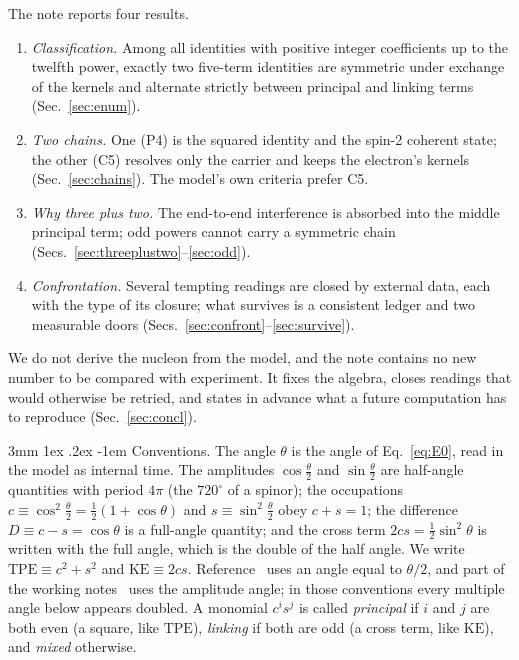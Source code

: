 \documentclass[%
 reprint, amsmath,amssymb, aps, prb, ]{revtex4-2}
\makeatletter
\numberwithin{equation}{section}
\renewcommand\paragraph{%
  \@startsection{paragraph}{4}{\z@}%
    {3mm \@plus 1ex \@minus .2ex}%
    {-1em}%
    {\normalfont\normalsize\itshape}}
\makeatother
\begin{document}
The note reports four results.
\begin{enumerate}[leftmargin=*,itemsep=1pt]
\item \emph{Classification.} Among all identities with positive integer coefficients up to the twelfth power, exactly two five-term identities are symmetric under exchange of the kernels and alternate strictly between principal and linking terms (Sec.~\ref{sec:enum}).
\item \emph{Two chains.} One (P4) is the squared identity and the spin-2 coherent state; the other (C5) resolves only the carrier and keeps the electron's kernels (Sec.~\ref{sec:chains}). The model's own criteria prefer C5.
\item \emph{Why three plus two.} The end-to-end interference is absorbed into the middle principal term; odd powers cannot carry a symmetric chain (Secs.~\ref{sec:threeplustwo}--\ref{sec:odd}).
\item \emph{Confrontation.} Several tempting readings are closed by external data, each with the type of its closure; what survives is a consistent ledger and two measurable doors (Secs.~\ref{sec:confront}--\ref{sec:survive}).
\end{enumerate}

We do not derive the nucleon from the model, and the note contains no new number to be compared with experiment. It fixes the algebra, closes readings that would otherwise be retried, and states in advance what a future computation has to reproduce (Sec.~\ref{sec:concl}).

\paragraph{Conventions.} The angle $\theta$ is the angle of Eq.~\eqref{eq:E0}, read in the model as internal time. The amplitudes $\cos\frac{\theta}{2}$ and $\sin\frac{\theta}{2}$ are half-angle quantities with period $4\pi$ (the $720^\circ$ of a spinor); the occupations $c\equiv\cos^2\frac{\theta}{2}=\frac{1}{2}(1+\cos\theta)$ and $s\equiv\sin^2\frac{\theta}{2}$ obey $c+s=1$; the difference $D\equiv c-s=\cos\theta$ is a full-angle quantity; and the cross term $2cs=\frac12\sin^2\theta$ is written with the full angle, which is the double of the half angle. We write $\mathrm{TPE}\equiv c^2+s^2$ and $\mathrm{KE}\equiv2cs$. Reference~\cite{ref:p38} uses an angle equal to $\theta/2$, and part of the working notes~\cite{ref:trunks} uses the amplitude angle; in those conventions every multiple angle below appears doubled. A monomial $c^is^j$ is called \emph{principal} if $i$ and $j$ are both even (a square, like $\mathrm{TPE}$), \emph{linking} if both are odd (a cross term, like $\mathrm{KE}$), and \emph{mixed} otherwise.
\end{document}
